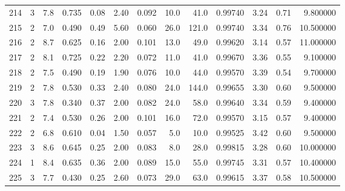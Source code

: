 \begin{tabular}{lrrrrrrrrrrrr}
214  &        3 &            7.8 &             0.735 &         0.08 &            2.40 &      0.092 &                 10.0 &                  41.0 &  0.99740 &  3.24 &       0.71 &   9.800000 \\
215  &        2 &            7.0 &             0.490 &         0.49 &            5.60 &      0.060 &                 26.0 &                 121.0 &  0.99740 &  3.34 &       0.76 &  10.500000 \\
216  &        2 &            8.7 &             0.625 &         0.16 &            2.00 &      0.101 &                 13.0 &                  49.0 &  0.99620 &  3.14 &       0.57 &  11.000000 \\
217  &        2 &            8.1 &             0.725 &         0.22 &            2.20 &      0.072 &                 11.0 &                  41.0 &  0.99670 &  3.36 &       0.55 &   9.100000 \\
218  &        2 &            7.5 &             0.490 &         0.19 &            1.90 &      0.076 &                 10.0 &                  44.0 &  0.99570 &  3.39 &       0.54 &   9.700000 \\
219  &        2 &            7.8 &             0.530 &         0.33 &            2.40 &      0.080 &                 24.0 &                 144.0 &  0.99655 &  3.30 &       0.60 &   9.500000 \\
220  &        3 &            7.8 &             0.340 &         0.37 &            2.00 &      0.082 &                 24.0 &                  58.0 &  0.99640 &  3.34 &       0.59 &   9.400000 \\
221  &        2 &            7.4 &             0.530 &         0.26 &            2.00 &      0.101 &                 16.0 &                  72.0 &  0.99570 &  3.15 &       0.57 &   9.400000 \\
222  &        2 &            6.8 &             0.610 &         0.04 &            1.50 &      0.057 &                  5.0 &                  10.0 &  0.99525 &  3.42 &       0.60 &   9.500000 \\
223  &        3 &            8.6 &             0.645 &         0.25 &            2.00 &      0.083 &                  8.0 &                  28.0 &  0.99815 &  3.28 &       0.60 &  10.000000 \\
224  &        1 &            8.4 &             0.635 &         0.36 &            2.00 &      0.089 &                 15.0 &                  55.0 &  0.99745 &  3.31 &       0.57 &  10.400000 \\
225  &        3 &            7.7 &             0.430 &         0.25 &            2.60 &      0.073 &                 29.0 &                  63.0 &  0.99615 &  3.37 &       0.58 &  10.500000 \\

\end{tabular}

